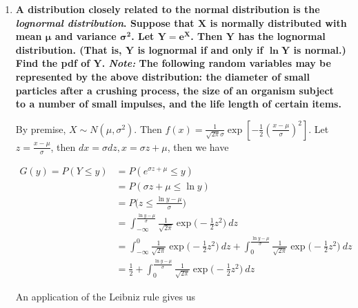 \documentclass[10pt, oneside]{article}
\begin{document}
\begin{enumerate}[label=9.\arabic*]
\begin{align*}
= \int^{+\infty}_{-\infty} \frac{1}{2 \pi u} \ du &= \frac{1}{2 \pi} \ln u \bigg|^{+\infty}_{-\infty} \\
&= \frac{1}{2 \pi} \ln |z^2 + 1| \bigg|^{+\infty}_{-\infty}
\end{align*}

Which is $\boxed{ \text{undefined}}$, and therefore the Cauchy distribution has no expectation.

\item  \begin{tcolorbox}[
  colback=Cerulean!5!white,
  colframe=Cerulean!75!black]
\textbf{A distribution closely related to the normal distribution is the \textit{lognormal distribution}. Suppose that $\bm{X}$ is normally distributed with mean $\bm{\mu}$ and variance $\bm{\sigma^2}$. Let $\bm{Y = e^X}$. Then $\bm{Y}$ has the lognormal distribution. (That is, $\bm{Y}$ is lognormal if and only if $\bm{\ln Y}$ is normal.) Find the pdf of $\bm{Y}$. \textit{Note:} The following random variables may be represented by the above distribution: the diameter of small particles after a crushing process, the size of an organism subject to a number of small impulses, and the life length of certain items.}
\end{tcolorbox}

By premise, $X \sim N(\mu, \sigma^2)$. Then $f(x) = \frac{1}{\sqrt{2 \pi} \sigma} \exp [-\frac{1}{2} (\frac{x - \mu}{\sigma})^2]$. Let $z = \frac{x - \mu}{\sigma}$, then $dx = \sigma dz, x = \sigma z + \mu$, then we have

\begin{align*}
G(y) = P(Y \leq y) &= P(e^{\sigma z + \mu} \leq y) \\
&= P(\sigma z + \mu \leq \ln y) \\
&= P\bigg( z \leq \frac{\ln y - \mu}{\sigma} \bigg) \\
&= \int^{\frac{\ln y - \mu}{\sigma}}_{-\infty} \frac{1}{\sqrt{2\pi}} \exp \bigg( -\frac{1}{2} z^2 \bigg) \ dz \\
&= \int^{0}_{-\infty} \frac{1}{\sqrt{2\pi}} \exp \bigg( -\frac{1}{2} z^2 \bigg) \ dz + \int^{\frac{\ln y - \mu}{\sigma}}_{0} \frac{1}{\sqrt{2\pi}} \exp \bigg( -\frac{1}{2} z^2 \bigg) \ dz \\
&= \frac{1}{2} + \int^{\frac{\ln y - \mu}{\sigma}}_{0} \frac{1}{\sqrt{2\pi}} \exp \bigg( -\frac{1}{2} z^2 \bigg) \ dz
\end{align*}

An application of the Leibniz rule gives us


\end{enumerate}
\end{document}

